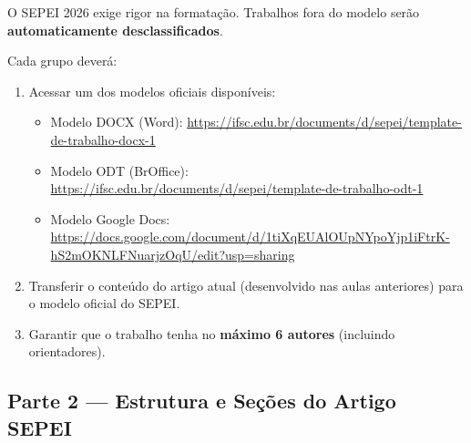 \begin{boxAtividade}

O SEPEI 2026 exige rigor na formatação. Trabalhos fora do modelo serão \textbf{automaticamente desclassificados}.

Cada grupo deverá:

\begin{enumerate}
\item Acessar um dos modelos oficiais disponíveis:
    \begin{itemize}
        \item Modelo DOCX (Word): \url{https://ifsc.edu.br/documents/d/sepei/template-de-trabalho-docx-1}
        \item Modelo ODT (BrOffice): \url{https://ifsc.edu.br/documents/d/sepei/template-de-trabalho-odt-1}
        \item Modelo Google Docs: \url{https://docs.google.com/document/d/1tiXqEUAlOUpNYpoYjp1iFtrK-hS2mOKNLFNuarjzOqU/edit?usp=sharing}
    \end{itemize}
\item Transferir o conteúdo do artigo atual (desenvolvido nas aulas anteriores) para o modelo oficial do SEPEI.
\item Garantir que o trabalho tenha no \textbf{máximo 6 autores} (incluindo orientadores).
\end{enumerate}

\end{boxAtividade}


\subsection{Parte 2 — Estrutura e Seções do Artigo SEPEI}

